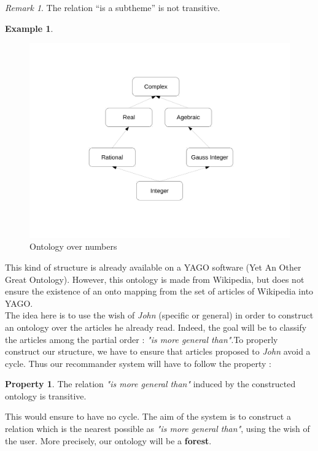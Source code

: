 \documentclass[11pt]{article}
\theoremstyle{plain}
\theoremstyle{definition}
\newtheorem{exmp}{Example}[section]
\newtheorem{pro}{Property}
\theoremstyle{remark}
\newtheorem*{rem}{Remark}
\begin{document}
\vspace*{5mm}

\begin{rem}
  The relation ``is a subtheme'' is not transitive.
\end{rem}
\vspace*{5mm}
\newpage
\begin{exmp}
\end{exmp}
\begin{figure}[!h]
  \center
  \includegraphics[scale = 0.3]{ExOntology.pdf}
  \caption{Ontology over numbers}
\end{figure}


This kind of structure is already available on a YAGO software (Yet An Other Great Ontology). However, this ontology is made from Wikipedia, but does not ensure the existence of an onto mapping from the set of articles of Wikipedia into YAGO.\\
The idea here is to use the wish of \textit{John} (specific or general) in order to construct an ontology over the articles he already read. Indeed, the goal will be to classify the articles among the partial order : \textit{"is more general than"}.To properly construct our structure, we have to ensure that articles proposed to \textit{John} avoid a cycle. Thus our recommander system will have to follow the property : 

\begin{pro}
The relation \textit{"is more general than"} induced by the constructed ontology is transitive. 
\end{pro}

This would ensure to have no cycle. The aim of the system is to construct a relation which is the nearest possible as \textit{"is more general than"}, using the wish of the user. More precisely, our ontology will be a \textbf{forest}.\\
\end{document}
